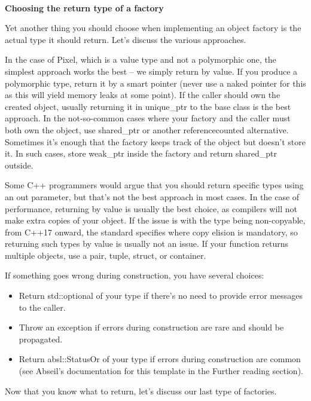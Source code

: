 \hspace*{\fill} \\ %
\noindent
\textbf{Choosing the return type of a factory}

Yet another thing you should choose when implementing an object factory is the actual type it should return. Let's discuss the various approaches.

In the case of Pixel, which is a value type and not a polymorphic one, the simplest approach works the best – we simply return by value. If you produce a polymorphic type, return it by a smart pointer (never use a naked pointer for this as this will yield memory leaks at some point). If the caller should own the created object, usually returning it in unique\_ptr to the base class is the best approach. In the not-so-common cases where your factory and the caller must both own the object, use shared\_ptr or another referencecounted alternative. Sometimes it's enough that the factory keeps track of the object but doesn't store it. In such cases, store weak\_ptr inside the factory and return shared\_ptr outside.

Some C++ programmers would argue that you should return specific types using an out parameter, but that's not the best approach in most cases. In the case of performance, returning by value is usually the best choice, as compilers will not make extra copies of your object. If the issue is with the type being non-copyable, from C++17 onward, the standard specifies where copy elision is mandatory, so returning such types by value is usually not an issue. If your function returns multiple objects, use a pair, tuple, struct, or container.

If something goes wrong during construction, you have several choices:

\begin{itemize}
\item 
Return std::optional of your type if there's no need to provide error messages to the caller.

\item 
Throw an exception if errors during construction are rare and should be propagated.

\item 
Return absl::StatusOr of your type if errors during construction are common (see Abseil's documentation for this template in the Further reading section).
\end{itemize}

Now that you know what to return, let's discuss our last type of factories.

